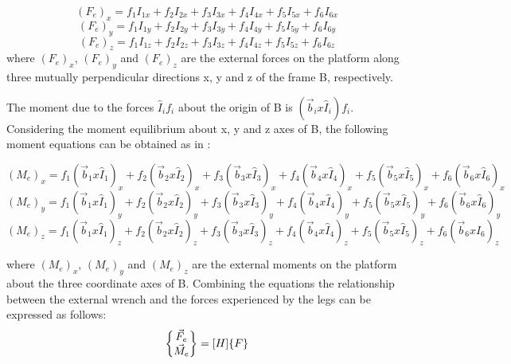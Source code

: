 \begin{equation}
	(F_e)_x = f_1I_{1x} + f_2I_{2x} + f_3I_{3x} + f_4I_{4x} + f_5I_{5x} + f_6I_{6x}
\end{equation}
\begin{equation}
	(F_e)_y = f_1I_{1y} + f_2I_{2y} + f_3I_{3y} + f_4I_{4y} + f_5I_{5y} + f_6I_{6y}
\end{equation}
\begin{equation}
	(F_e)_z = f_1I_{1z} + f_2I_{2z} + f_3I_{3z} + f_4I_{4z} + f_5I_{5z} + f_6I_{6z}
\end{equation}
where $(F_e)_x$, $(F_e)_y$ and $(F_e)_z$ are the external forces on the platform along three mutually perpendicular directions x, y and z of the frame B, respectively.

The moment due to the forces $\hat{I}_if_i$ about the origin of B is $(\vec{b}_i x \hat{I}_i)f_i$. Considering the moment equilibrium about x, y and z axes of B, the following moment equations can be obtained as in \cite{dwarakanath_design_2001}:

\begin{equation}
	(M_e)_x = f_1(\vec{b}_1 x \hat{I}_1)_x + f_2(\vec{b}_2 x \hat{I}_2)_x + f_3(\vec{b}_3 x \hat{I}_3)_x + f_4(\vec{b}_4 x \hat{I}_4)_x + f_5(\vec{b}_5 x \hat{I}_5)_x + f_6(\vec{b}_6 x \hat{I}_6)_x
\end{equation}
\begin{equation}
	(M_e)_y = f_1(\vec{b}_1 x \hat{I}_1)_y + f_2(\vec{b}_2 x \hat{I}_2)_y + f_3(\vec{b}_3 x \hat{I}_3)_y + f_4(\vec{b}_4 x \hat{I}_4)_y + f_5(\vec{b}_5 x \hat{I}_5)_y + f_6(\vec{b}_6 x \hat{I}_6)_y
\end{equation}
\begin{equation}
	(M_e)_z = f_1(\vec{b}_1 x \hat{I}_1)_z + f_2(\vec{b}_2 x \hat{I}_2)_z + f_3(\vec{b}_3 x \hat{I}_3)_z + f_4(\vec{b}_4 x \hat{I}_4)_z + f_5(\vec{b}_5 x \hat{I}_5)_z + f_6(\vec{b}_6 x \hat{I}_6)_z
\end{equation}

where $(M_e)_x$, $(M_e)_y$ and $(M_e)_z$ are the external moments on the platform  about the three coordinate axes of B. Combining the equations the relationship between the external wrench and the forces experienced by the legs can be expressed as follows:
\begin{equation}
	$$
\begin{Bmatrix}
	\vec{F}_e \\
	\vec{M}_e \\
\end{Bmatrix} = [H]\{F\}
$$
\end{equation}

